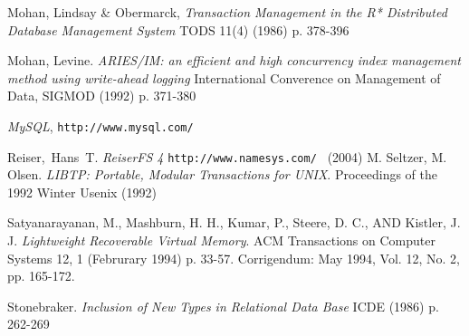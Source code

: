 \documentclass[10pt,letterpaper,twocolumn,english]{article}
\begin{document}
\begin{thebibliography}{99}
 Mohan, Lindsay \& Obermarck, {\em Transaction Management in the R* Distributed Database Management System} TODS 11(4) (1986) p. 378-396

 Mohan, Levine. {\em ARIES/IM: an efficient and high concurrency index management method using write-ahead logging} International Converence on Management of Data, SIGMOD (1992) p. 371-380

 {\em MySQL}, {\tt http://www.mysql.com/ }

 Reiser,~Hans~T. {\em ReiserFS 4} {\tt http://www.namesys.com/ } (2004)
%
 M. Seltzer, M. Olsen. {\em LIBTP: Portable, Modular Transactions for UNIX}. Proceedings of the 1992 Winter Usenix (1992)

 Satyanarayanan, M., Mashburn, H. H., Kumar, P., Steere, D. C., AND Kistler, J. J. {\em Lightweight Recoverable Virtual Memory}. ACM Transactions on Computer Systems 12, 1 (Februrary 1994) p. 33-57. Corrigendum: May 1994, Vol. 12, No. 2, pp. 165-172.

 Stonebraker. {\em Inclusion of New Types in Relational Data Base } ICDE (1986) p. 262-269

%
%


%
%
%
%
%
%
%

\end{thebibliography}
\end{document}
